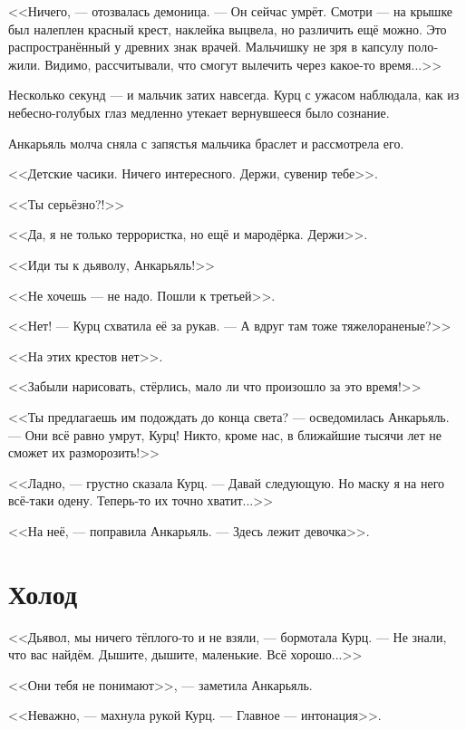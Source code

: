 \documentclass[a4paper,10pt,fleqn]{book}\usepackage{polyglossia}\setdefaultlanguage[babelshorthands=true]{russian}\setotherlanguage{english}\defaultfontfeatures{Ligatures=TeX,Mapping=tex-text}\usepackage{xcolor}\newcommand{\ml}[3]{#2}
\begin{document}
<<Ничего, --- отозвалась демоница.
--- Он сейчас умрёт.
Смотри --- на крышке был налеплен красный крест, наклейка выцвела, но различить ещё можно.
Это распространённый у древних знак врачей.
Мальчишку не зря в капсулу положили.
Видимо, рассчитывали, что смогут вылечить через какое-то время...>>

Несколько секунд --- и мальчик затих навсегда.
Курц с ужасом наблюдала, как из небесно-голубых глаз медленно утекает вернувшееся было сознание.

Анкарьяль молча сняла с запястья мальчика браслет и рассмотрела его.

\ml{$0$}
{<<Детские часики.}
{``A children watch.}
\ml{$0$}
{Ничего интересного.}
{Zero percent interest.}
Держи, сувенир тебе>>.

\ml{$0$}
{<<Ты серьёзно?!>>}
{``Seriously!''}

\ml{$0$}
{<<Да, я не только террористка, но ещё и мародёрка.}
{``Yes, I'm not only a terrorist, but a marauder too.}
Держи>>.

\ml{$0$}
{<<Иди ты к дьяволу, Анкарьяль!>>}
{``Fuck yourself, Angaralle!''}

\ml{$0$}
{<<Не хочешь --- не надо.}
{``Take it, or leave it.}
Пошли к третьей>>.

<<Нет! --- Курц схватила её за рукав.
--- А вдруг там тоже тяжелораненые?>>

<<На этих крестов нет>>.

<<Забыли нарисовать, стёрлись, мало ли что произошло за это время!>>

<<Ты предлагаешь им подождать до конца света? --- осведомилась Анкарьяль.
--- Они всё равно умрут, Курц!
Никто, кроме нас, в ближайшие тысячи лет не сможет их разморозить!>>

<<Ладно, --- грустно сказала Курц.
--- Давай следующую.
Но маску я на него всё-таки одену.
Теперь-то их точно хватит...>>

<<На неё, --- поправила Анкарьяль.
--- Здесь лежит девочка>>.

\section{Холод}

<<Дьявол, мы ничего тёплого-то и не взяли, --- бормотала Курц.
--- Не знали, что вас найдём.
Дышите, дышите, маленькие.
Всё хорошо...>>

<<Они тебя не понимают>>, --- заметила Анкарьяль.

<<Неважно, --- махнула рукой Курц.
--- Главное --- интонация>>.
\end{document}

